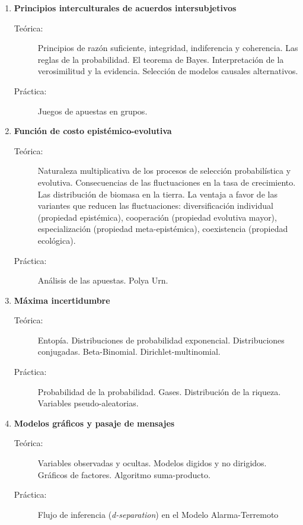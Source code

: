 \documentclass[10pt]{article}
\begin{document}
\begin{enumerate}

\item \textbf{Principios interculturales de acuerdos intersubjetivos}
\vspace{-0.15cm}
\begin{description}
\item[Teórica:] Principios de razón suficiente, integridad, indiferencia y coherencia. Las reglas de la probabilidad. El teorema de Bayes. Interpretación de la verosimilitud y la evidencia. Selección de modelos causales alternativos. 
\item[Práctica:] Juegos de apuestas en grupos. 
\end{description}

\vspace{0.1cm}
\item \textbf{Función de costo epistémico-evolutiva}
\vspace{-0.15cm}
\begin{description}
\item[Teórica:] Naturaleza multiplicativa de los procesos de selección probabilística y evolutiva. Consecuencias de las fluctuaciones en la tasa de crecimiento. Las distribución de biomasa en la tierra. La ventaja a favor de las variantes que reducen las fluctuaciones: diversificación individual (propiedad epistémica), cooperación (propiedad evolutiva mayor), especialización (propiedad meta-epistémica), coexistencia (propiedad ecológica).
\item[Práctica:] Análisis de las apuestas. Polya Urn. 
\end{description}


\vspace{0.1cm}
\item \textbf{Máxima incertidumbre}
\vspace{-0.15cm}
\begin{description}
\item[Teórica:] Entopía. Distribuciones de probabilidad exponencial. Distribuciones conjugadas. Beta-Binomial. Dirichlet-multinomial.
\item[Práctica:] Probabilidad de la probabilidad. Gases. Distribución de la riqueza. Variables pseudo-aleatorias.
\end{description}


\vspace{0.1cm}
\item \textbf{Modelos gráficos y pasaje de mensajes}
\vspace{-0.15cm}
\begin{description}
\item[Teórica:] Variables observadas y ocultas. Modelos digidos y no dirigidos. Gráficos de factores. Algoritmo suma-producto. 
\item[Práctica:] Flujo de inferencia (\emph{d-separation}) en el Modelo Alarma-Terremoto
\end{description}


\end{enumerate}
\end{document}
